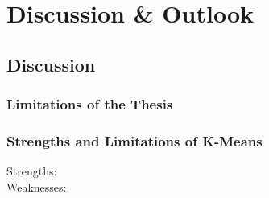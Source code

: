\chapter{Discussion \& Outlook}
\label{cha:discussion}




\section{Discussion}
\subsection{Limitations of the Thesis}

\subsection{Strengths and Limitations of K-Means}
\begin{description}
    \item[Strengths:]
    \item[Weaknesses:]  
\end{description}

